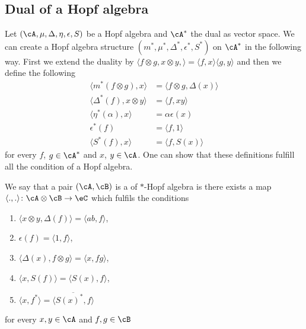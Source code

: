 \subsection{Dual of a Hopf algebra}

Let $(\cA,\mu,\Delta,\eta,\epsilon,S)$ be a Hopf algebra and $\cA^*$ the dual as vector space. We can create a Hopf algebra structure $(m^*,\mu^*,\Delta^*,\epsilon^*,S^*)$ on $\cA^*$ in the following way. First we extend the duality by $\langle f\otimes g,x\otimes y, \rangle =\langle f, x\rangle \langle g, y\rangle $ and then we define the following
\begin{subequations}
	\begin{align}
		\langle m^*(f\otimes g), x\rangle      & =\langle f\otimes g, \Delta(x)\rangle    \label{subeqDualHopfmult} \\
		\langle \Delta^*(f), x\otimes y\rangle & =\langle f, xy\rangle                                              \\
		\langle \eta^*(\alpha), x\rangle       & =\alpha\epsilon(x)                                                 \\
		\epsilon^*(f)                          & =\langle f, 1\rangle                                               \\
		\langle S^*(f), x\rangle               & =\langle f, S(x)\rangle
	\end{align}
\end{subequations}
for every $f$, $g\in\cA^*$ and $x$, $y\in\cA$. One can show that these definitions fulfill all the condition of a Hopf algebra.

We say that a pair $(\cA,\cB)$ is a  of $*$-Hopf algebra is there exists a map $\langle ., .\rangle \colon \cA\otimes\cB\to \eC$ which fulfils the conditions
\begin{enumerate}

	\item
	      $\langle x\otimes y, \Delta(f)\rangle =\langle ab, f\rangle $,
	\item
	      $\epsilon(f)=\langle 1, f\rangle $,
	\item
	      $\langle \Delta(x), f\otimes g\rangle =\langle x, fg\rangle $,
	\item
	      $\langle x, S(f)\rangle =\langle S(x), f\rangle $,
	\item
	      $\langle x, f^*\rangle =\overline{ \langle S(x)^*, f\rangle  }$

\end{enumerate}
for every $x,y\in\cA$ and $f,g\in\cB$

